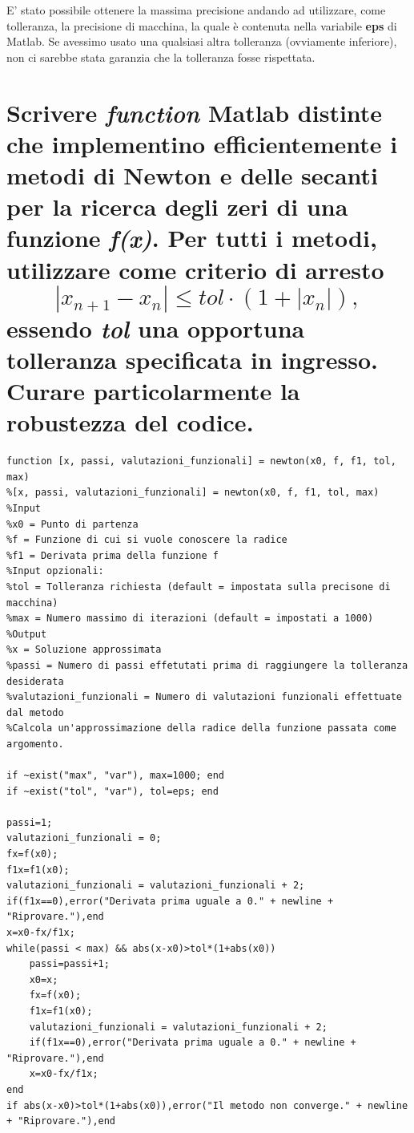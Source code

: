 \documentclass[10pt,a4paper]{article}
\begin{document}
E' stato possibile ottenere la massima precisione andando ad utilizzare, come tolleranza,
la precisione di macchina, la quale è contenuta nella variabile \textbf{eps} di Matlab.
Se avessimo usato una qualsiasi altra tolleranza (ovviamente inferiore), non ci sarebbe
stata garanzia che la tolleranza fosse rispettata.

\section{Scrivere \textit{function} Matlab distinte che implementino efficientemente i metodi di Newton
e delle secanti per la ricerca degli zeri di una funzione \textit{f(x)}. Per tutti i metodi, utilizzare
come criterio di arresto $$ |x_{n+1} - x_n| \le \textit{tol} \cdot (1 + |x_n|),  $$
essendo \textit{tol} una opportuna tolleranza specificata in ingresso.
Curare particolarmente la robustezza del codice.}
\begin{lstlisting}[style=Matlab-editor]
  function [x, passi, valutazioni_funzionali] = newton(x0, f, f1, tol, max)
%[x, passi, valutazioni_funzionali] = newton(x0, f, f1, tol, max)
%Input
%x0 = Punto di partenza
%f = Funzione di cui si vuole conoscere la radice
%f1 = Derivata prima della funzione f
%Input opzionali:
%tol = Tolleranza richiesta (default = impostata sulla precisone di macchina)
%max = Numero massimo di iterazioni (default = impostati a 1000)
%Output
%x = Soluzione approssimata
%passi = Numero di passi effetutati prima di raggiungere la tolleranza desiderata 
%valutazioni_funzionali = Numero di valutazioni funzionali effettuate dal metodo
%Calcola un'approssimazione della radice della funzione passata come argomento.

if ~exist("max", "var"), max=1000; end
if ~exist("tol", "var"), tol=eps; end

passi=1;
valutazioni_funzionali = 0;
fx=f(x0);
f1x=f1(x0);
valutazioni_funzionali = valutazioni_funzionali + 2;
if(f1x==0),error("Derivata prima uguale a 0." + newline + "Riprovare."),end
x=x0-fx/f1x;
while(passi < max) && abs(x-x0)>tol*(1+abs(x0))
    passi=passi+1;
    x0=x;
    fx=f(x0);
    f1x=f1(x0);
    valutazioni_funzionali = valutazioni_funzionali + 2;
    if(f1x==0),error("Derivata prima uguale a 0." + newline + "Riprovare."),end
    x=x0-fx/f1x;
end
if abs(x-x0)>tol*(1+abs(x0)),error("Il metodo non converge." + newline + "Riprovare."),end
\end{lstlisting}
\end{document}
